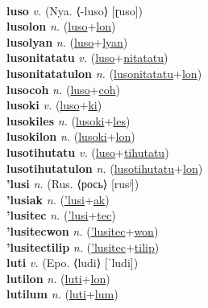  \label{lucipumak} \\
\textbf{luso} \textit{v.} (Nya. ⟨-luso⟩ [ɽuso])
 \label{luso} \\
\textbf{lusolon} \textit{n.} (\hyperref[luso]{luso}+\hyperref[lon]{lon})
 \label{lusolon} \\
\textbf{lusolyan} \textit{n.} (\hyperref[luso]{luso}+\hyperref[lyan]{lyan})
 \label{lusolyan} \\
\textbf{lusonitatatu} \textit{v.} (\hyperref[luso]{luso}+\hyperref[nitatatu]{nitatatu})
 \label{lusonitatatu} \\
\textbf{lusonitatatulon} \textit{n.} (\hyperref[lusonitatatu]{lusonitatatu}+\hyperref[lon]{lon})
 \label{lusonitatatulon} \\
\textbf{lusocoh} \textit{n.} (\hyperref[luso]{luso}+\hyperref[coh]{coh})
 \label{lusocoh} \\
\textbf{lusoki} \textit{v.} (\hyperref[luso]{luso}+\hyperref[ki]{ki})
 \label{lusoki} \\
\textbf{lusokiles} \textit{n.} (\hyperref[lusoki]{lusoki}+\hyperref[les]{les})
 \label{lusokiles} \\
\textbf{lusokilon} \textit{n.} (\hyperref[lusoki]{lusoki}+\hyperref[lon]{lon})
 \label{lusokilon} \\
\textbf{lusotihutatu} \textit{v.} (\hyperref[luso]{luso}+\hyperref[tihutatu]{tihutatu})
 \label{lusotihutatu} \\
\textbf{lusotihutatulon} \textit{n.} (\hyperref[lusotihutatu]{lusotihutatu}+\hyperref[lon]{lon})
 \label{lusotihutatulon} \\
\textbf{'lusi} \textit{n.} (Rus. ⟨рось⟩ [rusʲ])
 \label{'lusi} \\
\textbf{'lusiak} \textit{n.} (\hyperref['lusi]{'lusi}+\hyperref[ak]{ak})
 \label{'lusiak} \\
\textbf{'lusitec} \textit{n.} (\hyperref['lusi]{'lusi}+\hyperref[tec]{tec})
 \label{'lusitec} \\
\textbf{'lusitecwon} \textit{n.} (\hyperref['lusitec]{'lusitec}+\hyperref[won]{won})
 \label{'lusitecwon} \\
\textbf{'lusitectilip} \textit{n.} (\hyperref['lusitec]{'lusitec}+\hyperref[tilip]{tilip})
 \label{'lusitectilip} \\
\textbf{luti} \textit{v.} (Epo. ⟨ludi⟩ [ˈludi])
 \label{luti} \\
\textbf{lutilon} \textit{n.} (\hyperref[luti]{luti}+\hyperref[lon]{lon})
 \label{lutilon} \\
\textbf{lutilum} \textit{n.} (\hyperref[luti]{luti}+\hyperref[lum]{lum})
